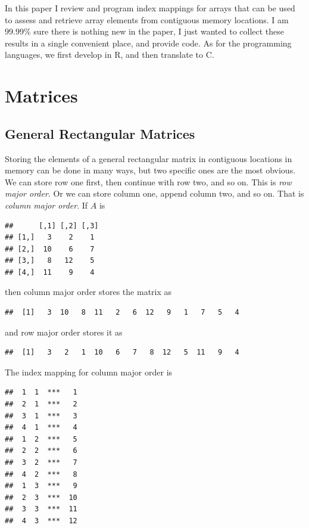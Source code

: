 \documentclass[12pt,]{article}
\begin{document}
In this paper I review and program index mappings for arrays that can be
used to assess and retrieve array elements from contiguous memory
locations. I am \(99.99\%\) sure there is nothing new in the paper, I
just wanted to collect these results in a single convenient place, and
provide code. As for the programming languages, we first develop in R,
and then translate to C.

\section{Matrices}\label{matrices}

\subsection{General Rectangular
Matrices}\label{general-rectangular-matrices}

Storing the elements of a general rectangular matrix in contiguous
locations in memory can be done in many ways, but two specific ones are
the most obvious. We can store row one first, then continue with row
two, and so on. This is \emph{row major order}. Or we can store column
one, append column two, and so on. That is \emph{column major order}. If
\(A\) is

\begin{verbatim}
##      [,1] [,2] [,3]
## [1,]   3    2    1 
## [2,]  10    6    7 
## [3,]   8   12    5 
## [4,]  11    9    4
\end{verbatim}

then column major order stores the matrix as

\begin{verbatim}
##  [1]   3  10   8  11   2   6  12   9   1   7   5   4
\end{verbatim}

and row major order stores it as

\begin{verbatim}
##  [1]   3   2   1  10   6   7   8  12   5  11   9   4
\end{verbatim}

The index mapping for column major order is

\begin{verbatim}
##  1  1  ***   1 
##  2  1  ***   2 
##  3  1  ***   3 
##  4  1  ***   4 
##  1  2  ***   5 
##  2  2  ***   6 
##  3  2  ***   7 
##  4  2  ***   8 
##  1  3  ***   9 
##  2  3  ***  10 
##  3  3  ***  11 
##  4  3  ***  12
\end{verbatim}
\end{document}
